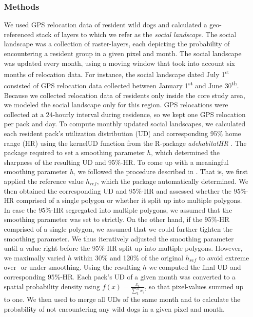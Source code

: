 \documentclass[abstract=on,10pt,a4paper,bibliography=totocnumbered]{scrartcl}
\begin{document}
\subsubsection{Methods}
We used GPS relocation data of resident wild dogs and calculated a
geo-referenced stack of layers to which we refer as the \textit{social
landscape}. The social landscape was a collection of raster-layers, each
depicting the probability of encountering a resident group in a given pixel and
month. The social landscape was updated every month, using a moving window that
took into account six months of relocation data. For instance, the social
landscape dated July 1\textsuperscript{st} consisted of GPS relocation data
collected between January 1\textsuperscript{st} and June 30\textsuperscript{th}.
Because we collected relocation data of residents only inside the core study
area, we modeled the social landscape only for this region. GPS relocations were
collected at a 24-hourly interval during residence, so we kept one GPS
relocation per pack and day. To compute monthly updated social landscapes, we
calculated each resident pack's utilization distribution (UD) and corresponding
95\% home range (HR) using the kernelUD function from the R-package
\textit{adehabitatHR} \citep{Calenge.2019}. The package required to set a
smoothing parameter \(h\), which determined the sharpness of the resulting UD
and 95\%-HR. To come up with a meaningful smoothing parameter \(h\), we followed
the procedure described in \cite{Cozzi.2018}. That is, we first applied the
reference value \( h_{ref} \), which the package automatically determined. We
then obtained the corresponding UD and 95\%-HR and assessed whether the 95\%-HR
comprised of a single polygon or whether it split up into multiple polygons. In
case the 95\%-HR segregated into multiple polygons, we assumed that the
smoothing parameter was set to strictly. On the other hand, if the 95\%-HR
comprised of a single polygon, we assumed that we could further tighten the
smoothing parameter. We thus iteratively adjusted the smoothing parameter until
a value right before the 95\%-HR split up into multiple polygons. However, we
maximally varied \( h \) within 30\% and 120\% of the original \( h_{ref} \) to
avoid extreme over- or under-smoothing. Using the resulting \(h\) we computed
the final UD and corresponding 95\%-HR. Each pack's UD of a given month was
converted to a spatial probability density using \(f(x) =
\frac{x_i}{\sum_1^n{x_i}}\), so that pixel-values summed up to one. We then used
 to merge all UDs of the same month and to calculate the probability
of not encountering any wild dogs in a given pixel and month.
\end{document}
